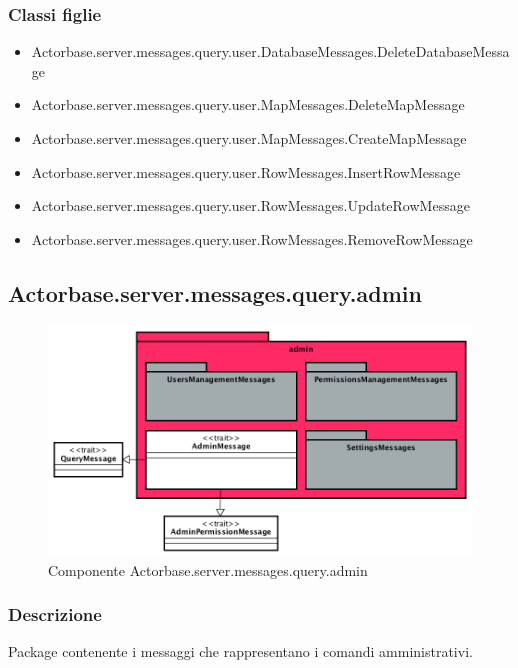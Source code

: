 \documentclass[a4paper]{article}
\begin{document}
			\subsubsection{Classi figlie}
				\begin{itemize}
					\item Actorbase.server.messages.query.user.DatabaseMessages.DeleteDatabaseMessage
					\item Actorbase.server.messages.query.user.MapMessages.DeleteMapMessage
					\item Actorbase.server.messages.query.user.MapMessages.CreateMapMessage
					\item Actorbase.server.messages.query.user.RowMessages.InsertRowMessage
					\item Actorbase.server.messages.query.user.RowMessages.UpdateRowMessage
					\item Actorbase.server.messages.query.user.RowMessages.RemoveRowMessage
				\end{itemize}
				
		\subsection{Actorbase.server.messages.query.admin}
		
			\begin{figure}[H]
				\centering
				\includegraphics[scale=0.70]{ST/Server/adminLevel}
				\caption{Componente Actorbase.server.messages.query.admin}
			\end{figure}
			
			\subsubsection{Descrizione}
				Package contenente i messaggi che rappresentano i comandi amministrativi.
				
\end{document}
